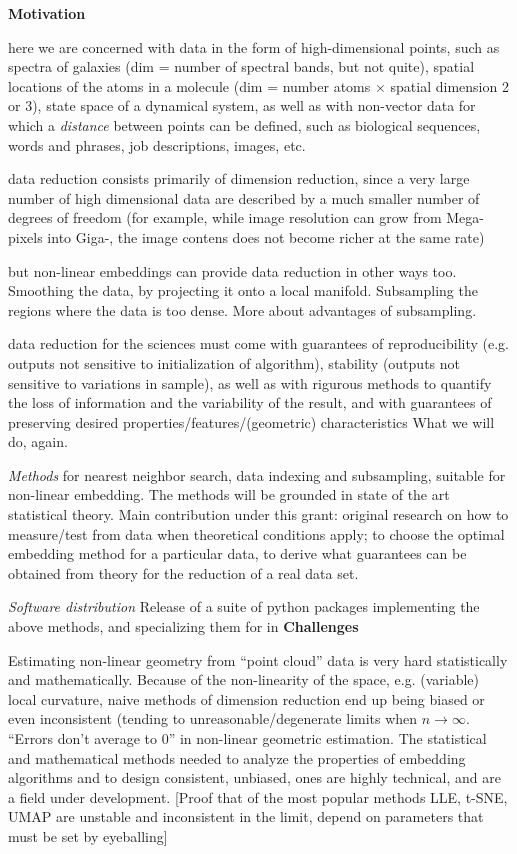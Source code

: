 \documentclass[floatfix,11pt]{article}
\begin{document}
\textbf{Motivation}
\bit
\item here we are concerned with data in the form of high-dimensional points, such as spectra of galaxies (dim = number of spectral bands, but not quite), spatial locations of the atoms in a molecule (dim = number atoms $\times$ spatial dimension 2 or 3), state space of a dynamical system, as well as with non-vector data for which a {\em distance} between points can be defined, such as biological sequences, words and phrases, job descriptions, images, etc.
\item data reduction consists primarily of dimension reduction, since a very large number of high dimensional data are described by a much smaller number of degrees of freedom (for example, while image resolution can grow from Mega-pixels into Giga-, the image contens does not become richer at the same rate)
\item but non-linear embeddings can provide data reduction in other ways too. Smoothing the data, by projecting it onto a local manifold. Subsampling the regions where the data is too dense. More about advantages of subsampling.
\item data reduction for the sciences must come with guarantees of
  reproducibility (e.g. outputs not sensitive to initialization of
  algorithm), stability (outputs not sensitive to variations in
  sample), as well as with rigurous methods to quantify the loss of
  information and the variability of the result, and with
  guarantees of preserving desired properties/features/(geometric)
  characteristics
  \eit
What we will do, again.
\bit
\item  {\em Methods} for nearest neighbor search, data indexing and subsampling, suitable for non-linear embedding. The methods will be grounded in state of the art statistical theory. Main contribution under this grant: original research on how to measure/test from data when theoretical conditions apply; to choose the optimal embedding method for a particular data, to derive what guarantees can be obtained from theory for the reduction of a real data set. 
\item {\em Software distribution} Release of a suite of python packages implementing the above methods, and specializing them for  in  
\eit
  \textbf{Challenges}
  \bit
\item Estimating non-linear geometry from ``point cloud'' data is very hard statistically and mathematically. Because of the non-linearity of the space, e.g.  (variable) local curvature, naive methods of dimension reduction end up being biased or even inconsistent (tending to unreasonable/degenerate limits when $n\rightarrow \infty$. ``Errors don't average to 0'' in non-linear geometric estimation. The statistical and mathematical methods needed to analyze the properties of embedding algorithms and to design consistent, unbiased, ones are highly technical, and are a field under development. [Proof that of the most popular methods LLE, t-SNE, UMAP are unstable and inconsistent in the limit, depend on parameters that must be set by eyeballing]
\end{document}
